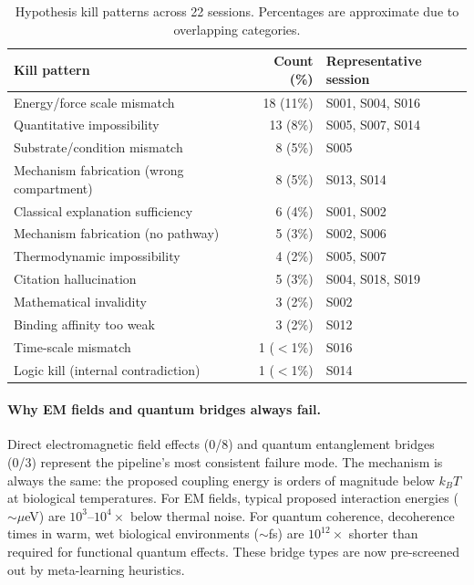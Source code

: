 \begin{table}[htbp]
\centering
\caption{Hypothesis kill patterns across 22 sessions. Percentages are approximate due to overlapping categories.}
\label{tab:kill_patterns}
\small
\begin{tabular}{@{}lrl@{}}
\toprule
\textbf{Kill pattern} & \textbf{Count (\%)} & \textbf{Representative session} \\
\midrule
Energy/force scale mismatch & 18 (11\%) & S001, S004, S016 \\
Quantitative impossibility & 13 (8\%) & S005, S007, S014 \\
Substrate/condition mismatch & 8 (5\%) & S005 \\
Mechanism fabrication (wrong compartment) & 8 (5\%) & S013, S014 \\
Classical explanation sufficiency & 6 (4\%) & S001, S002 \\
Mechanism fabrication (no pathway) & 5 (3\%) & S002, S006 \\
Thermodynamic impossibility & 4 (2\%) & S005, S007 \\
Citation hallucination & 5 (3\%) & S004, S018, S019 \\
Mathematical invalidity & 3 (2\%) & S002 \\
Binding affinity too weak & 3 (2\%) & S012 \\
Time-scale mismatch & 1 ($<$1\%) & S016 \\
Logic kill (internal contradiction) & 1 ($<$1\%) & S014 \\
\bottomrule
\end{tabular}
\end{table}

\paragraph{Why EM fields and quantum bridges always fail.} Direct electromagnetic field effects (0/8) and quantum entanglement bridges (0/3) represent the pipeline's most consistent failure mode. The mechanism is always the same: the proposed coupling energy is orders of magnitude below $k_B T$ at biological temperatures. For EM fields, typical proposed interaction energies ($\sim\mu$eV) are $10^3$--$10^4\times$ below thermal noise. For quantum coherence, decoherence times in warm, wet biological environments ($\sim$fs) are $10^{12}\times$ shorter than required for functional quantum effects. These bridge types are now pre-screened out by meta-learning heuristics.

